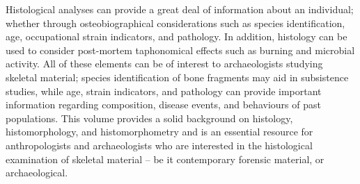 Histological analyses can provide a great deal of information about an individual; whether through osteobiographical considerations such as species identification, age, occupational strain indicators, and pathology. In addition, histology can be used to consider post-mortem taphonomical effects such as burning and microbial activity. All of these elements can be of interest to archaeologists studying skeletal material; species identification of bone fragments may aid in subsistence studies, while age, strain indicators, and pathology can provide important information regarding composition, disease events, and behaviours of past populations. This volume provides a solid background on histology, histomorphology, and histomorphometry and is an essential resource for anthropologists and archaeologists who are interested in the histological examination of skeletal material – be it contemporary forensic material, or archaeological. 

\IJSRAclosing%
